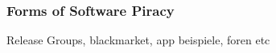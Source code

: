 \subsubsection{Forms of Software Piracy} \label{subsubsection:foundation-piracy-overview-forms}
Release Groups, blackmarket, app beispiele, foren etc\newline
